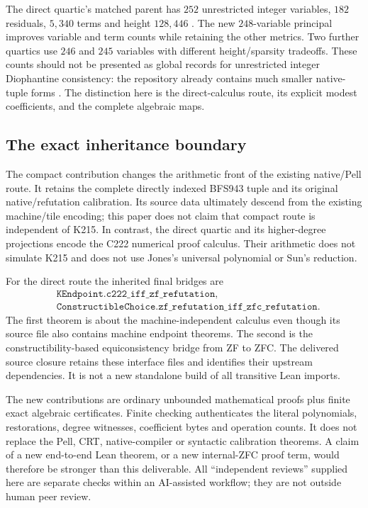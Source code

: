\documentclass[11pt,letterpaper]{article}
\theoremstyle{definition}
\theoremstyle{remark}
\begin{document}
The direct quartic's matched parent has $252$ unrestricted integer variables,
$182$ residuals, $5{,}340$ terms and height $128{,}446$
\cite{common}.  The new $248$-variable principal improves variable and term
counts while retaining the other metrics.  Two further quartics use $246$
and $245$ variables with different height/sparsity tradeoffs.  These counts
should not be presented as global records for unrestricted integer
Diophantine consistency: the repository already contains much smaller
native-tuple forms \cite{forms}.  The distinction here is the direct-calculus
route, its explicit modest coefficients, and the complete algebraic maps.

\subsection{The exact inheritance boundary}

The compact contribution changes the arithmetic front of the existing
native/Pell route.  It retains the complete directly indexed BFS943 tuple
and its original native/refutation calibration.  Its source data ultimately
descend from the existing machine/tile encoding; this paper does not claim
that compact route is independent of K215.  In contrast, the direct quartic
and its higher-degree projections encode the C222 numerical proof calculus.
Their arithmetic does not simulate K215 and does not use Jones's universal
polynomial or Sun's reduction.

For the direct route the inherited final bridges are
\begin{align*}
 &\texttt{KEndpoint.c222\_iff\_zf\_refutation},\\
 &\texttt{ConstructibleChoice.zf\_refutation\_iff\_zfc\_refutation}.
\end{align*}
The first theorem is about the machine-independent calculus even though its
source file also contains machine endpoint theorems.  The second is the
constructibility-based equiconsistency bridge from ZF to ZFC.  The delivered
source closure retains these interface files and identifies their upstream
dependencies.  It is not a new standalone build of all transitive Lean
imports.

The new contributions are ordinary unbounded mathematical proofs plus finite
exact algebraic certificates.  Finite checking authenticates the literal
polynomials, restorations, degree witnesses, coefficient bytes and operation
counts.  It does not replace the Pell, CRT, native-compiler or syntactic
calibration theorems.  A claim of a new end-to-end Lean theorem, or a new
internal-ZFC proof term, would therefore be stronger than this deliverable.
All ``independent reviews'' supplied here are separate checks within an
AI-assisted workflow; they are not outside human peer review.
\end{document}
